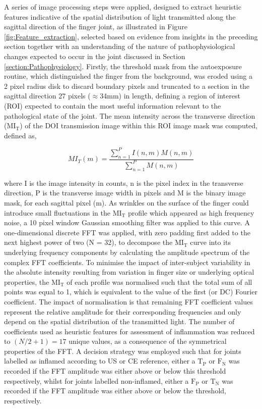 \documentclass[twoside]{bhamthesis}
\theoremstyle{definition}
\begin{document}
A series of image processing steps were applied, designed to extract heuristic features indicative of the spatial distribution of light transmitted along the sagittal direction of the finger joint, as illustrated in Figure \ref{fig:Feature_extraction}, selected based on evidence from insights in the preceding section together with an understanding of the nature of pathophysiological changes expected to occur in the joint discussed in Section \ref{section:Pathophysiology}. Firstly, the threshold mask from the autoexposure routine, which distinguished the finger from the background, was eroded using a 2 pixel radius disk to discard boundary pixels and truncated to a section in the sagittal direction 27 pixels ($\approx$34mm) in length, defining a region of interest (ROI) expected to contain the most useful information relevant to the pathological state of the joint. The mean intensity across the transverse direction ($\mathrm{MI_T}$) of the DOI transmission image within this ROI image mask was computed, defined as,

\begin{equation}
	MI_T(m) = \frac{\sum^{P}_{n=1} I(n,m)M(n,m)}{\sum^{P}_{n=1} M(n,m)}
\end{equation}

where I is the image intensity in counts, n is the pixel index in the transverse direction, P is the transverse image width in pixels and M is the binary image mask, for each sagittal pixel (m). As wrinkles on the surface of the finger could introduce small fluctuations in the $\mathrm{MI_T}$ profile which appeared as high frequency noise, a 10 pixel window Gaussian smoothing filter was applied to this curve. A one-dimensional discrete FFT was applied, with zero padding first added to the next highest power of two (N = 32), to decompose the $\mathrm{MI_T}$ curve into its underlying frequency components by calculating the amplitude spectrum of the complex FFT coefficients. To minimise the impact of inter-subject variability in the absolute intensity resulting from variation in finger size or underlying optical properties, the $\mathrm{MI_T}$ of each profile was normalised such that the total sum of all points was equal to 1, which is equivalent to the value of the first (or DC) Fourier coefficient. The impact of normalisation is that remaining FFT coefficient values represent the relative amplitude for their corresponding frequencies and only depend on the spatial distribution of the transmitted light. The number of coefficients used as heuristic features for assessment of inflammation was reduced to $(N/2+1)=17$ unique values, as a consequence of the symmetrical properties of the FFT. A decision strategy was employed such that for joints labelled as inflamed according to US or CE reference, either a $\mathrm{T_P}$ or $\mathrm{F_N}$ was recorded if the FFT amplitude was either above or below this threshold respectively, whilst for joints labelled non-inflamed, either a $\mathrm{F_P}$ or $\mathrm{T_N}$ was recorded if the FFT amplitude was either above or below the threshold, respectively.
\end{document}
